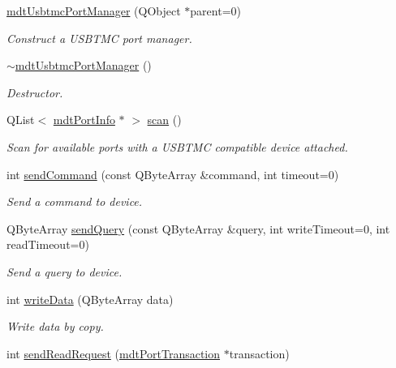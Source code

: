 \begin{DoxyCompactItemize}
\item 
\hyperlink{classmdt_usbtmc_port_manager_a99a24e4360e70ffc63677dbe888513f7}{mdtUsbtmcPortManager} (QObject $\ast$parent=0)
\begin{DoxyCompactList}\small\item\em Construct a USBTMC port manager. \end{DoxyCompactList}\item 
\hyperlink{classmdt_usbtmc_port_manager_aad6b2eef9b5cfb5c324affb6962a463b}{$\sim$mdtUsbtmcPortManager} ()
\begin{DoxyCompactList}\small\item\em Destructor. \end{DoxyCompactList}\item 
QList$<$ \hyperlink{classmdt_port_info}{mdtPortInfo} $\ast$ $>$ \hyperlink{classmdt_usbtmc_port_manager_a992d1227810186d3c7dc166452e2e3b6}{scan} ()
\begin{DoxyCompactList}\small\item\em Scan for available ports with a USBTMC compatible device attached. \end{DoxyCompactList}\item 
int \hyperlink{classmdt_usbtmc_port_manager_aaab645cfcafbac7a83a69f2084900246}{sendCommand} (const QByteArray \&command, int timeout=0)
\begin{DoxyCompactList}\small\item\em Send a command to device. \end{DoxyCompactList}\item 
QByteArray \hyperlink{classmdt_usbtmc_port_manager_a858590909ce63319a3390140c4d0a6ca}{sendQuery} (const QByteArray \&query, int writeTimeout=0, int readTimeout=0)
\begin{DoxyCompactList}\small\item\em Send a query to device. \end{DoxyCompactList}\item 
int \hyperlink{classmdt_usbtmc_port_manager_ab7229e9d519e80a6509bec90dc9239b3}{writeData} (QByteArray data)
\begin{DoxyCompactList}\small\item\em Write data by copy. \end{DoxyCompactList}\item 
int \hyperlink{classmdt_usbtmc_port_manager_a2920bdd6b189f198f132de9e5555a78b}{sendReadRequest} (\hyperlink{classmdt_port_transaction}{mdtPortTransaction} $\ast$transaction)

\end{DoxyCompactItemize}
